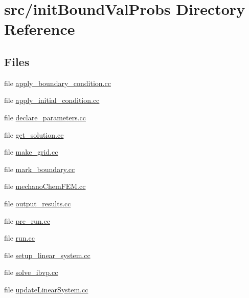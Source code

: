 \section{src/init\+Bound\+Val\+Probs Directory Reference}
\label{dir_2d09604be94b4570660f815b8c136696}
\subsection*{Files}
\begin{DoxyCompactItemize}
\item 
file \mbox{\hyperlink{apply__boundary__condition_8cc}{apply\+\_\+boundary\+\_\+condition.\+cc}}
\item 
file \mbox{\hyperlink{apply__initial__condition_8cc}{apply\+\_\+initial\+\_\+condition.\+cc}}
\item 
file \mbox{\hyperlink{init_bound_val_probs_2declare__parameters_8cc}{declare\+\_\+parameters.\+cc}}
\item 
file \mbox{\hyperlink{get__solution_8cc}{get\+\_\+solution.\+cc}}
\item 
file \mbox{\hyperlink{make__grid_8cc}{make\+\_\+grid.\+cc}}
\item 
file \mbox{\hyperlink{mark__boundary_8cc}{mark\+\_\+boundary.\+cc}}
\item 
file \mbox{\hyperlink{mechano_chem_f_e_m_8cc}{mechano\+Chem\+F\+E\+M.\+cc}}
\item 
file \mbox{\hyperlink{output__results_8cc}{output\+\_\+results.\+cc}}
\item 
file \mbox{\hyperlink{pre__run_8cc}{pre\+\_\+run.\+cc}}
\item 
file \mbox{\hyperlink{run_8cc}{run.\+cc}}
\item 
file \mbox{\hyperlink{setup__linear__system_8cc}{setup\+\_\+linear\+\_\+system.\+cc}}
\item 
file \mbox{\hyperlink{solve__ibvp_8cc}{solve\+\_\+ibvp.\+cc}}
\item 
file \mbox{\hyperlink{update_linear_system_8cc}{update\+Linear\+System.\+cc}}
\end{DoxyCompactItemize}
